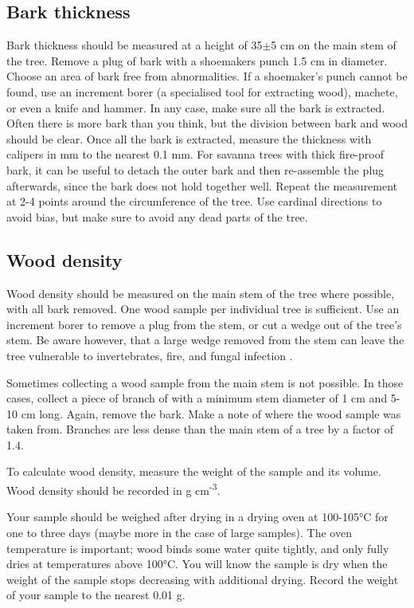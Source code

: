 \documentclass[11pt,a4paper]{article}
\begin{document}
\subsection{Bark thickness}

Bark thickness should be measured at a height of 35$\pm$5 cm on the main stem of the tree. Remove a plug of bark with a shoemakers punch \textapprox{}1.5 cm in diameter. Choose an area of bark free from abnormalities. If a shoemaker's punch cannot be found, use an increment borer (a specialised tool for extracting wood), machete, or even a knife and hammer. In any case, make sure all the bark is extracted. Often there is more bark than you think, but the division between bark and wood should be clear. Once all the bark is extracted, measure the thickness with calipers in mm to the nearest 0.1 mm. For savanna trees with thick fire-proof bark, it can be useful to detach the outer bark and then re-assemble the plug afterwards, since the bark does not hold together well. Repeat the measurement at 2-4 points around the circumference of the tree. Use cardinal directions to avoid bias, but make sure to avoid any dead parts of the tree.

\subsection{Wood density}

Wood density should be measured on the main stem of the tree where possible, with all bark removed. One wood sample per individual tree is sufficient. Use an increment borer to remove a plug from the stem, or cut a wedge out of the tree's stem. Be aware however, that a large wedge removed from the stem can leave the tree vulnerable to invertebrates, fire, and fungal infection \citep{Wigley2019, Schoonenberg2003}.

Sometimes collecting a wood sample from the main stem is not possible. In those cases, collect a piece of branch of with a minimum stem diameter of 1 cm and 5-10 cm long. Again, remove the bark. Make a note of where the wood sample was taken from. Branches are less dense than the main stem of a tree by a factor of \textapprox{}1.4.

To calculate wood density, measure the weight of the sample and its volume. Wood density should be recorded in g cm\textsuperscript{-3}.

Your sample should be weighed after drying in a drying oven at 100-105\si{\degree}C for one to three days (maybe more in the case of large samples). The oven temperature is important; wood binds some water quite tightly, and only fully dries at temperatures above 100\si{\degree}C. You will know the sample is dry when the weight of the sample stops decreasing with additional drying. Record the weight of your sample to the nearest 0.01 g.
\end{document}

